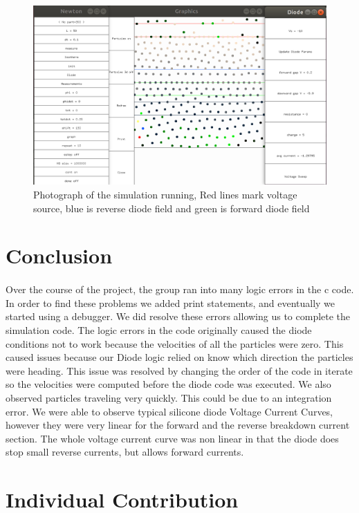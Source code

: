 \documentclass[a4paper]{article}
\begin{document}
\begin{figure}[H]
\centering
\includegraphics[scale=0.3]{sim.png}
\caption{\label{fig} Photograph of the simulation running, Red lines mark voltage source, blue is reverse diode field and green is forward diode field}
\end{figure}


\section{Conclusion}
\paragraph{}
Over the course of the project, the group ran into many logic errors in the c code. In order to find these problems we added print statements, and eventually we started using a debugger. We did resolve these errors allowing us to complete the simulation code. The logic errors in the code originally caused the diode conditions not to work because the velocities of all the particles were zero. This caused issues because our Diode logic relied on know which direction the particles were heading. This issue was resolved by changing the order of the code in iterate so the velocities were computed before the diode code was executed. We also observed particles traveling very quickly. This could be due to an integration error. We were able to observe typical silicone diode Voltage Current Curves, however they were very linear for the forward and the reverse breakdown current section. The whole voltage current curve was non linear in that the diode does stop small reverse currents, but allows forward currents.

\section{Individual Contribution}
\end{document}

